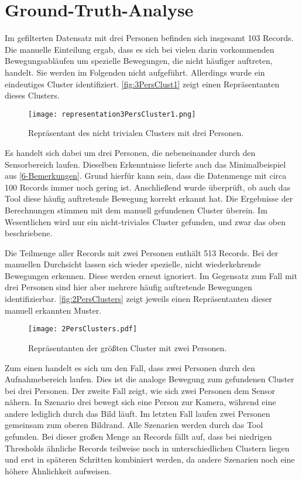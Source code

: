 \section{Ground-Truth-Analyse}
\label{6-GroundTruth}
Im gefilterten Datensatz mit drei Personen befinden sich insgesamt 103 Records.
Die manuelle Einteilung ergab,
dass es sich bei vielen darin vorkommenden Bewegungsabläufen
um spezielle Bewegungen, die nicht häufiger auftreten, handelt.
Sie werden im Folgenden nicht aufgeführt.
Allerdings wurde ein eindeutiges Cluster identifiziert.
\autoref{fig:3PersClust1} zeigt einen Repräsentanten dieses Clusters.
\begin{figure}[ht]
    \begin{center}
    \texttt{[image: representation3PersCluster1.png]}
    \end{center}
    \caption{Repräsentant des nicht trivialen Clusters mit drei Personen.}
    \label{fig:3PersClust1}
\end{figure}
Es handelt sich dabei um drei Personen, die nebeneinander durch den Sensorbereich laufen.
Dieselben Erkenntnisse lieferte auch das Minimalbeispiel aus \autoref{6-Bemerkungen}.
Grund hierfür kann sein, dass die Datenmenge mit circa 100 Records immer noch gering ist.
Anschließend wurde überprüft, ob auch das Tool diese häufig auftretende Bewegung korrekt erkannt hat.
Die Ergebnisse der Berechnungen stimmen mit dem manuell gefundenen Cluster überein.
Im Wesentlichen wird nur ein nicht-triviales Cluster gefunden,
und zwar das oben beschriebene.

Die Teilmenge aller Records mit zwei Personen enthält 513 Records.
Bei der manuellen Durchsicht lassen sich wieder spezielle,
nicht wiederkehrende Bewegungen erkennen.
Diese werden erneut ignoriert.
Im Gegensatz zum Fall mit drei Personen sind hier aber mehrere häufig auftretende Bewegungen identifizierbar.
\autoref{fig:2PersClusters} zeigt jeweils einen Repräsentanten dieser manuell erkannten Muster.
\begin{figure}[ht]
    \begin{center}
    \texttt{[image: 2PersClusters.pdf]}
    \end{center}
    \caption{Repräsentanten der größten Cluster mit zwei Personen.}
    \label{fig:2PersClusters}
\end{figure}
Zum einen handelt es sich um den Fall, dass zwei Personen durch den Aufnahmebereich laufen.
Dies ist die analoge Bewegung zum gefundenen Cluster bei drei Personen.
Der zweite Fall zeigt, wie sich zwei Personen dem Sensor nähern.
In Szenario drei bewegt sich eine Person zur Kamera,
während eine andere lediglich durch das Bild läuft.
Im letzten Fall laufen zwei Personen gemeinsam zum oberen Bildrand.
Alle Szenarien werden durch das Tool gefunden.
Bei dieser großen Menge an Records fällt auf,
dass bei niedrigen Thresholds ähnliche Records teilweise noch in unterschiedlichen Clustern liegen
und erst in späteren Schritten kombiniert werden,
da andere Szenarien noch eine höhere Ähnlichkeit aufweisen.

